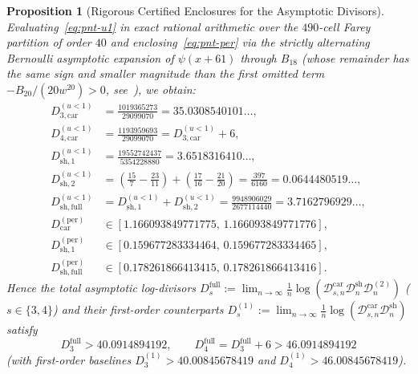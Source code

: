 \documentclass[11pt,reqno]{amsart}
\newtheorem{proposition}[theorem]{Proposition}
\theoremstyle{definition}
\theoremstyle{remark}
\begin{document}
\begin{proposition}[Rigorous Certified Enclosures for the Asymptotic Divisors]
\label{prop:enclosures}
Evaluating~\eqref{eq:pnt-u1} in exact rational arithmetic over the $490$-cell Farey partition of order $40$ and enclosing~\eqref{eq:pnt-per} via the strictly alternating Bernoulli asymptotic expansion of $\psi(x + 61)$ through $B_{18}$ (whose remainder has the same sign and smaller magnitude than the first omitted term $-B_{20}/(20 w^{20}) > 0$, see~\cite[Eq.~5.11.2]{DLMF}), we obtain:
\begin{align*}
  D_{3,\mathrm{car}}^{(u<1)} &= \frac{1019365273}{29099070} = 35.0308540101\ldots, \\
  D_{4,\mathrm{car}}^{(u<1)} &= \frac{1193959693}{29099070} = D_{3,\mathrm{car}}^{(u<1)} + 6, \\
  D_{\mathrm{sh}, 1}^{(u<1)} &= \frac{19552742437}{5354228880} = 3.6518316410\ldots, \\
  D_{\mathrm{sh}, 2}^{(u<1)} &= \left(\frac{15}{7} - \frac{23}{11}\right) + \left(\frac{17}{16} - \frac{21}{20}\right) = \frac{397}{6160} = 0.0644480519\ldots, \\
  D_{\mathrm{sh}, \mathrm{full}}^{(u<1)} &= D_{\mathrm{sh}, 1}^{(u<1)} + D_{\mathrm{sh}, 2}^{(u<1)} = \frac{9948906029}{2677114440} = 3.7162796929\ldots, \\
  D_{\mathrm{car}}^{(\mathrm{per})} &\in [1.166093849771775,\, 1.166093849771776], \\
  D_{\mathrm{sh}, 1}^{(\mathrm{per})} &\in [0.159677283334464,\, 0.159677283334465], \\
  D_{\mathrm{sh}, \mathrm{full}}^{(\mathrm{per})} &\in [0.178261866413415,\, 0.178261866413416].
\end{align*}
Hence the total asymptotic log-divisors $D_s^{\mathrm{full}} := \lim_{n\to\infty}\frac{1}{n}\log(\mathcal{D}_{s,n}^{\mathrm{car}}\mathcal{D}_n^{\mathrm{sh}}\mathcal{D}_n^{(2)})$ ($s \in \{3, 4\}$) and their first-order counterparts $D_s^{(1)} := \lim_{n\to\infty}\frac{1}{n}\log(\mathcal{D}_{s,n}^{\mathrm{car}}\mathcal{D}_n^{\mathrm{sh}})$ satisfy
\begin{equation}
\label{eq:D3-D4}
  D_3^{\mathrm{full}} > 40.0914894192,
  \qquad
  D_4^{\mathrm{full}} = D_3^{\mathrm{full}} + 6 > 46.0914894192
\end{equation}
(with first-order baselines $D_3^{(1)} > 40.00845678419$ and $D_4^{(1)} > 46.00845678419$).
\end{proposition}
\end{document}
